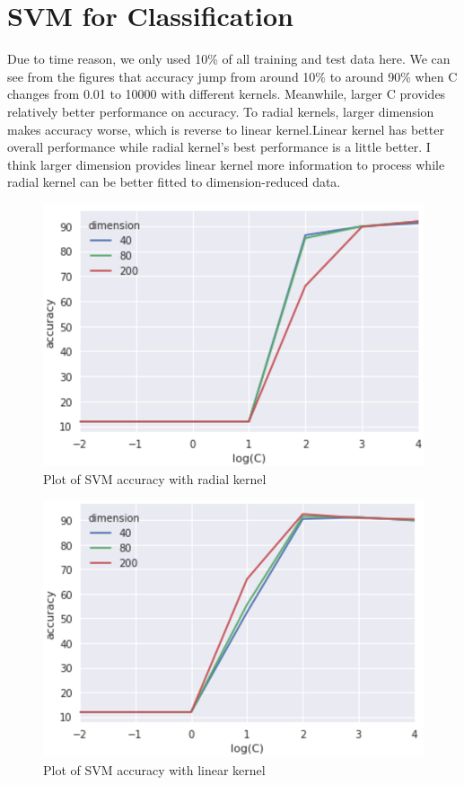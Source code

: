 \documentclass[11pt, oneside]{article}
\begin{document}
\section{SVM for Classification}
Due to time reason, we only used 10\% of all training and test data here. We can see from the figures that accuracy jump from around 10\% to around 90\% when C changes from 0.01 to 10000 with different kernels. Meanwhile, larger C provides relatively better performance on accuracy. To radial kernels, larger dimension makes accuracy worse, which is reverse to linear kernel.Linear kernel has better overall performance while radial kernel's best performance is a little better. I think larger dimension provides linear kernel more information to process while radial kernel can be better fitted to dimension-reduced data.

\begin{figure}
\centering
\includegraphics{./pics/radial_all.PNG}
\caption{Plot of SVM accuracy with radial kernel}
\end{figure}

\begin{figure}
\centering
\includegraphics{./pics/linear_all.PNG}
\caption{Plot of SVM accuracy with linear kernel}
\end{figure}
\end{document}
